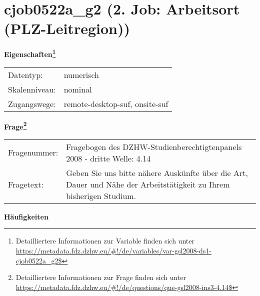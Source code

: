 
    \setcounter{footnote}{0}

    \vspace*{-1.8cm}
	\section{cjob0522a\_g2 (2. Job: Arbeitsort (PLZ-Leitregion))}
	\label{section:cjob0522a_g2}



    \vspace*{0.5cm}
    \noindent\textbf{Eigenschaften\footnote{Detailliertere Informationen zur Variable finden sich unter
		\url{https://metadata.fdz.dzhw.eu/\#!/de/variables/var-gsl2008-ds1-cjob0522a_g2$}}}\\
	\begin{tabularx}{\hsize}{@{}lX}
	Datentyp: & numerisch \\
	Skalenniveau: & nominal \\
	Zugangswege: &
	  remote-desktop-suf, 
	  onsite-suf
 \\
    \end{tabularx}



				\vspace*{0.5cm}
                \noindent\textbf{Frage\footnote{Detailliertere Informationen zur Frage finden sich unter
		              \url{https://metadata.fdz.dzhw.eu/\#!/de/questions/que-gsl2008-ins3-4.14$}}}\\
				\begin{tabularx}{\hsize}{@{}lX}
					Fragenummer: &
					  Fragebogen des DZHW-Studienberechtigtenpanels 2008 - dritte Welle:
					  4.14
 \\
					Fragetext: & Geben Sie uns bitte nähere Auskünfte über die Art, Dauer und Nähe der Arbeitstätigkeit zu Ihrem bisherigen Studium. \\
				\end{tabularx}





        		\vspace*{0.5cm}
                \noindent\textbf{Häufigkeiten}

